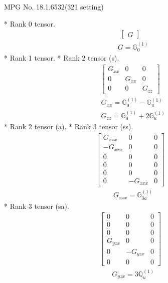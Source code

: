 \documentclass[fleqn,8pt,landscape]{jsarticle}
\begin{document}
\setcounter{MaxMatrixCols}{32}

\renewcommand{\tablename}{Table~}
\renewcommand{\figurename}{Figure~}
\begin{center}
\LARGE
MPG No. 18.1.65\quad$32$\quad(321 setting)
\end{center}
* Rank 0 tensor.
\begin{align*}
\begin{bmatrix} G \end{bmatrix}
\end{align*}
\begin{align*}
& G = \mathbb{G}_{0}^{(1)}
\end{align*}
* Rank 1 tensor.
* Rank 2 tensor (s).
\begin{align*}
\begin{bmatrix} G_{xx} & 0 & 0 \\ 0 & G_{xx} & 0 \\ 0 & 0 & G_{zz} \end{bmatrix}
\end{align*}
\begin{align*}
& G_{xx} = \mathbb{G}_{0}^{(1)} - \mathbb{G}_{u}^{(1)} \\
& G_{zz} = \mathbb{G}_{0}^{(1)} + 2 \mathbb{G}_{u}^{(1)}
\end{align*}
* Rank 2 tensor (a).
* Rank 3 tensor (ss).
\begin{align*}
\begin{bmatrix} G_{xxx} & 0 & 0 \\ - G_{xxx} & 0 & 0 \\ 0 & 0 & 0 \\ 0 & 0 & 0 \\ 0 & 0 & 0 \\ 0 & - G_{xxx} & 0 \end{bmatrix}
\end{align*}
\begin{align*}
& G_{xxx} = \mathbb{G}_{3a}^{(1)}
\end{align*}
* Rank 3 tensor (sa).
\begin{align*}
\begin{bmatrix} 0 & 0 & 0 \\ 0 & 0 & 0 \\ 0 & 0 & 0 \\ G_{yzx} & 0 & 0 \\ 0 & - G_{yzx} & 0 \\ 0 & 0 & 0 \end{bmatrix}
\end{align*}
\begin{align*}
& G_{yzx} = 3 \mathbb{Q}_{u}^{(1)}
\end{align*}
\end{document}
